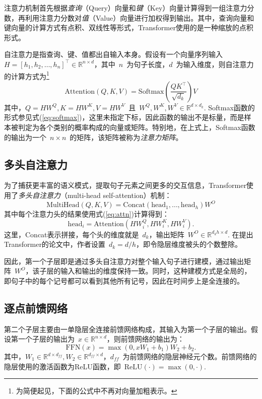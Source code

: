 注意力机制首先根据\emph{查询}（Query）向量和\emph{键}（Key）向量计算得到一组注意力分数，再利用注意力分数对\emph{值}（Value）向量进行加权得到输出。其中，查询向量和键向量的计算方式有点积、双线性等形式，Transformer使用的是一种缩放的点积形式。

自注意力是指查询、键、值都出自输入本身。假设有一个向量序列输入~$H = [h_1, h_2, \hdots, h_n]^\top \in \mathbb{R}^{n\times d}$，其中~$n$~为句子长度，$d$~为输入维度，则自注意力的计算方式为\footnote{为简便起见，下面的公式中不再对向量加粗表示。}
\begin{equation}
	\mathrm{Attention}(Q,K,V) = \mathrm{Softmax}(\frac{QK^\top}{\sqrt{d_k}})V
	\label{eq:attn}
\end{equation}
其中，$Q=HW^Q, K=HW^K, V=HW^V$\ 且\ $W^Q, W^K, W^V\in \mathbb{R}^{d\times d_k}$. Softmax函数的形式参见式(\ref{eq:softmax})，这里未指定下标，因此函数的输出不是标量，而是样本被判定为各个类别的概率构成的向量或矩阵。特别地，在上式上，Softmax函数的输出为一个~$n\times n$~的矩阵，该矩阵被称为\emph{注意力矩阵}。

\subsection{多头自注意力}
为了捕获更丰富的语义模式，提取句子元素之间更多的交互信息，Transformer使用了\emph{多头自注意力}（multi-head self-attention）机制：
\begin{equation}
	\mathrm{MultiHead}(Q,K,V) = \mathrm{Concat}(\mathrm{head}_1, \hdots, \mathrm{head}_h)W^O
\end{equation}
其中每个注意力头的结果使用式(\ref{eq:attn})计算得到：
\begin{equation}
	\mathrm{head}_i = \mathrm{Attention}(HW_i^Q, HW_i^K, HW_i^V).
\end{equation}
这里，Concat表示拼接，每个头的维度就是~$d_k$，输出矩阵~$W^O\in \mathbb{R}^{d_kh \times d}$. 在提出Transformer的论文中，作者设置~$d_k=d/h$，即令隐层维度被头的个数整除。

因此，第一个子层即是通过多头自注意力对整个输入句子进行建模，通过输出矩阵~$W^O$，该子层的输入和输出的维度保持一致。同时，这种建模方式是全局的，即句子中的每个记号都可以看到其他所有记号，因此在时间步上是全连接的。

\subsection{逐点前馈网络}
第二个子层主要由一单隐层全连接前馈网络构成，其输入为第一个子层的输出。假设第一个子层的输出为~$x\in \mathbb{R}^{n\times d}$，则前馈网络的输出为：
\begin{equation}
	\mathrm{FFN}(x) = \max(0, xW_1+b_1)W_2+b_2.
\end{equation}
其中，$W_1 \in \mathbb{R}^{d\times d_{ff}}, W_2 \in \mathbb{R}^{d_{ff} \times d}$，$d_{ff}$~为前馈网络的隐层神经元个数。前馈网络的隐层使用的激活函数为ReLU函数，即~$\mathrm{ReLU}(\cdot)=\max(0, \cdot)$.

